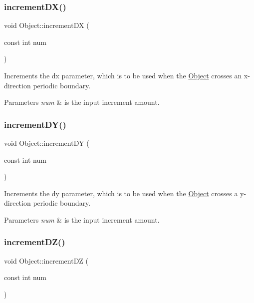 \subsubsection{\texorpdfstring{increment\+D\+X()}{incrementDX()}}
{\footnotesize\ttfamily void Object\+::increment\+DX (\begin{DoxyParamCaption}\item[{const int}]{num }\end{DoxyParamCaption})}



Increments the dx parameter, which is to be used when the \hyperlink{class_object}{Object} crosses an x-\/direction periodic boundary. 


\begin{DoxyParams}{Parameters}
{\em num} & is the input increment amount. \\
\hline
\end{DoxyParams}
\mbox{\label{class_object_a9df010818be72d15bad7985bf8a89ba0}} 
\subsubsection{\texorpdfstring{increment\+D\+Y()}{incrementDY()}}
{\footnotesize\ttfamily void Object\+::increment\+DY (\begin{DoxyParamCaption}\item[{const int}]{num }\end{DoxyParamCaption})}



Increments the dy parameter, which is to be used when the \hyperlink{class_object}{Object} crosses a y-\/direction periodic boundary. 


\begin{DoxyParams}{Parameters}
{\em num} & is the input increment amount. \\
\hline
\end{DoxyParams}
\mbox{\label{class_object_a440b267c478f5d63db1954bdbd543408}} 
\subsubsection{\texorpdfstring{increment\+D\+Z()}{incrementDZ()}}
{\footnotesize\ttfamily void Object\+::increment\+DZ (\begin{DoxyParamCaption}\item[{const int}]{num }\end{DoxyParamCaption})}



